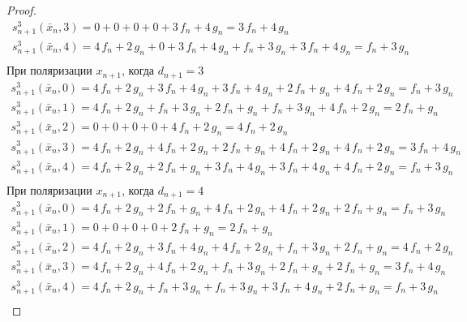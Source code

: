 \documentclass[bibliography=totoc, a4paper, 14pt]{extarticle}
\begin{document}
\begin{proof}
$$\begin{array}{l}
s_{n+1}^3(\bar{x}_n, 3) = 0 + 0 + 0 + 0 + 3\,f_n + 4\,g_n = 3\,f_n + 4\,g_n \\
s_{n+1}^3(\bar{x}_n, 4) = 4\,f_n + 2\,g_n + 0 + 3\,f_n + 4\,g_n + f_n + 3\,g_n + 3\,f_n + 4\,g_n = f_n + 3\,g_n \\
\end{array}$$
При поляризации $x_{n+1}$, когда $d_{n+1} = 3$
$$\begin{array}{l}
s_{n+1}^3(\bar{x}_n, 0) = 4\,f_n + 2\,g_n + 3\,f_n + 4\,g_n + 3\,f_n + 4\,g_n + 2\,f_n + g_n + 4\,f_n + 2\,g_n = f_n + 3\,g_n \\
s_{n+1}^3(\bar{x}_n, 1) = 4\,f_n + 2\,g_n + f_n + 3\,g_n + 2\,f_n + g_n + f_n + 3\,g_n + 4\,f_n + 2\,g_n = 2\,f_n + g_n \\
s_{n+1}^3(\bar{x}_n, 2) = 0 + 0 + 0 + 0 + 4\,f_n + 2\,g_n = 4\,f_n + 2\,g_n \\
s_{n+1}^3(\bar{x}_n, 3) = 4\,f_n + 2\,g_n + 4\,f_n + 2\,g_n + 2\,f_n + g_n + 4\,f_n + 2\,g_n + 4\,f_n + 2\,g_n = 3\,f_n + 4\,g_n \\
s_{n+1}^3(\bar{x}_n, 4) = 4\,f_n + 2\,g_n + 2\,f_n + g_n + 3\,f_n + 4\,g_n + 3\,f_n + 4\,g_n + 4\,f_n + 2\,g_n = f_n + 3\,g_n \\
\end{array}$$
При поляризации $x_{n+1}$, когда $d_{n+1} = 4$
$$\begin{array}{l}
s_{n+1}^3(\bar{x}_n, 0) = 4\,f_n + 2\,g_n + 2\,f_n + g_n + 4\,f_n + 2\,g_n + 4\,f_n + 2\,g_n + 2\,f_n + g_n = f_n + 3\,g_n \\
s_{n+1}^3(\bar{x}_n, 1) = 0 + 0 + 0 + 0 + 2\,f_n + g_n = 2\,f_n + g_n \\
s_{n+1}^3(\bar{x}_n, 2) = 4\,f_n + 2\,g_n + 3\,f_n + 4\,g_n + 4\,f_n + 2\,g_n + f_n + 3\,g_n + 2\,f_n + g_n = 4\,f_n + 2\,g_n \\
s_{n+1}^3(\bar{x}_n, 3) = 4\,f_n + 2\,g_n + 4\,f_n + 2\,g_n + f_n + 3\,g_n + 2\,f_n + g_n + 2\,f_n + g_n = 3\,f_n + 4\,g_n \\
s_{n+1}^3(\bar{x}_n, 4) = 4\,f_n + 2\,g_n + f_n + 3\,g_n + f_n + 3\,g_n + 3\,f_n + 4\,g_n + 2\,f_n + g_n = f_n + 3\,g_n \\
\end{array}$$

\end{proof}
\end{document}
